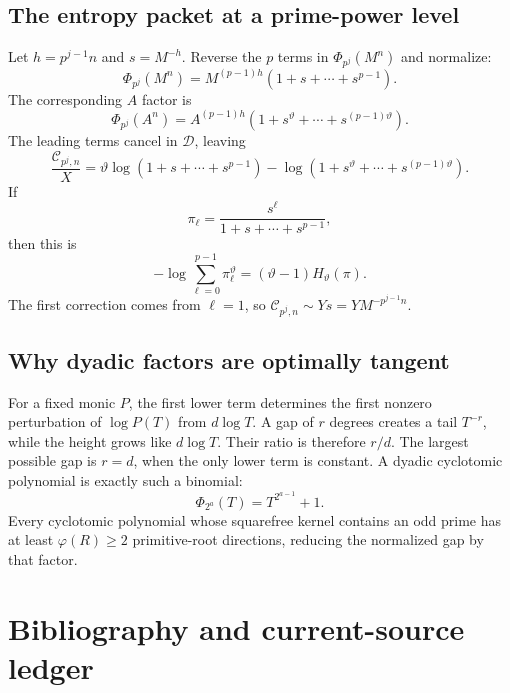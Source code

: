 \documentclass[11pt]{article}
\theoremstyle{definition}
\newcommand{\vphi}{\varphi}
\newcommand{\vtheta}{\vartheta}
\newcommand{\Dlog}{\mathscr D}
\begin{document}
\subsection{The entropy packet at a prime-power level}

Let $h=p^{j-1}n$ and $s=M^{-h}$.  Reverse the $p$ terms in
$\Phi_{p^j}(M^n)$ and normalize:
\[
 \Phi_{p^j}(M^n)=M^{(p-1)h}(1+s+\cdots+s^{p-1}).
\]
The corresponding $A$ factor is
\[
 \Phi_{p^j}(A^n)=A^{(p-1)h}(1+s^{\vtheta}+\cdots+s^{(p-1)\vtheta}).
\]
The leading terms cancel in $\Dlog$, leaving
\[
 \frac{\mathcal C_{p^j,n}}X
 =\vtheta\log(1+s+\cdots+s^{p-1})
 -\log(1+s^{\vtheta}+\cdots+s^{(p-1)\vtheta}).
\]
If
\[
 \pi_\ell=\frac{s^\ell}{1+s+\cdots+s^{p-1}},
\]
then this is
\[
 -\log\sum_{\ell=0}^{p-1}\pi_\ell^{\vtheta}
 =(\vtheta-1)H_{\vtheta}(\pi).
\]
The first correction comes from $\ell=1$, so
$\mathcal C_{p^j,n}\sim Y s=Y M^{-p^{j-1}n}$.

\subsection{Why dyadic factors are optimally tangent}

For a fixed monic $P$, the first lower term determines the first nonzero perturbation of
$\log P(T)$ from $d\log T$.  A gap of $r$ degrees creates a tail $T^{-r}$, while the
height grows like $d\log T$.  Their ratio is therefore $r/d$.  The largest possible gap is
$r=d$, when the only lower term is constant.  A dyadic cyclotomic polynomial is exactly
such a binomial:
\[
 \Phi_{2^a}(T)=T^{2^{a-1}}+1.
\]
Every cyclotomic polynomial whose squarefree kernel contains an odd prime has at least
$\vphi(R)\ge2$ primitive-root directions, reducing the normalized gap by that factor.

\section{Bibliography and current-source ledger}
\end{document}
